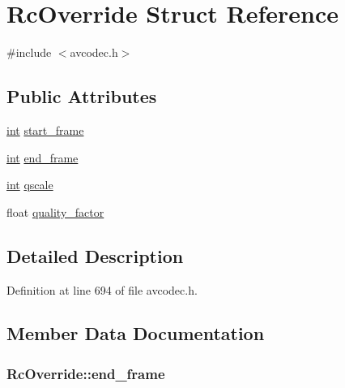 \hypertarget{struct_rc_override}{}\section{Rc\+Override Struct Reference}
\label{struct_rc_override}


{\ttfamily \#include $<$avcodec.\+h$>$}

\subsection*{Public Attributes}
\begin{DoxyCompactItemize}
\item 
\hyperlink{xmltok_8h_a5a0d4a5641ce434f1d23533f2b2e6653}{int} \hyperlink{struct_rc_override_adba2ede2813367b12a1060571ecac63c}{start\+\_\+frame}
\item 
\hyperlink{xmltok_8h_a5a0d4a5641ce434f1d23533f2b2e6653}{int} \hyperlink{struct_rc_override_adfac60a604f4b61cb80c9ec0fb3f42b3}{end\+\_\+frame}
\item 
\hyperlink{xmltok_8h_a5a0d4a5641ce434f1d23533f2b2e6653}{int} \hyperlink{struct_rc_override_ab19147a3f876e82f52405f6d8a831915}{qscale}
\item 
float \hyperlink{struct_rc_override_aeaf7e06332eed4f0d9f900178a8faa83}{quality\+\_\+factor}
\end{DoxyCompactItemize}


\subsection{Detailed Description}


Definition at line 694 of file avcodec.\+h.



\subsection{Member Data Documentation}
\subsubsection[{\texorpdfstring{end\+\_\+frame}{end_frame}}]{ Rc\+Override\+::end\+\_\+frame}\hypertarget{struct_rc_override_adfac60a604f4b61cb80c9ec0fb3f42b3}{}\label{struct_rc_override_adfac60a604f4b61cb80c9ec0fb3f42b3}


